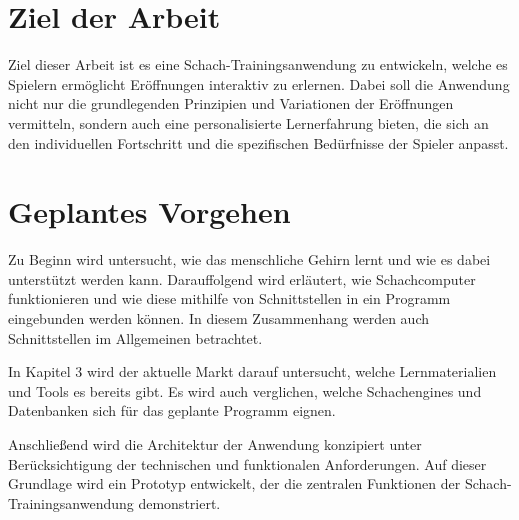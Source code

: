 \section{Ziel der Arbeit}
Ziel dieser Arbeit ist es eine Schach-Trainingsanwendung zu entwickeln, welche es Spielern ermöglicht Eröffnungen interaktiv zu erlernen. Dabei soll die Anwendung nicht nur die grundlegenden Prinzipien und Variationen der Eröffnungen vermitteln, sondern auch eine personalisierte Lernerfahrung bieten, die sich an den individuellen Fortschritt und die spezifischen Bedürfnisse der Spieler anpasst.

\section{Geplantes Vorgehen}
Zu Beginn wird untersucht, wie das menschliche Gehirn lernt und wie es dabei unterstützt werden kann. Darauffolgend wird erläutert, wie Schachcomputer funktionieren und wie diese mithilfe von Schnittstellen in ein Programm eingebunden werden können. In diesem Zusammenhang werden auch Schnittstellen im Allgemeinen betrachtet.

In Kapitel 3 wird der aktuelle Markt darauf untersucht, welche Lernmaterialien und Tools es bereits gibt. Es wird auch verglichen, welche Schachengines und Datenbanken sich für das geplante Programm eignen.

Anschließend wird die Architektur der Anwendung konzipiert unter Berücksichtigung der technischen und funktionalen Anforderungen. Auf dieser Grundlage wird ein Prototyp entwickelt, der die zentralen Funktionen der Schach-Trainingsanwendung demonstriert.
